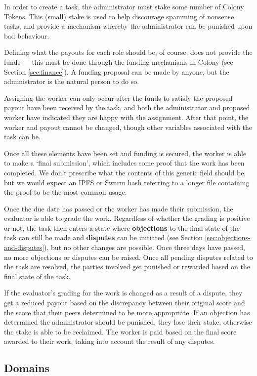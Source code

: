 In order to create a task, the administrator must stake some number of Colony Tokens. This (small) stake is used to help discourage spamming of nonsense tasks, and provide a mechanism whereby the administrator can be punished upon bad behaviour. 

Defining what the payouts for each role should be, of course, does not provide the funds --- this must be done through the funding mechanisms in Colony (see Section \ref{sec:finance}). A funding proposal can be made by anyone, but the administrator is the natural person to do so.

Assigning the worker can only occur after the funds to satisfy the proposed payout have been received by the task, and both the administrator and proposed worker have indicated they are happy with the assignment. After that point, the worker and payout cannot be changed, though other variables associated with the task can be.

Once all these elements have been set and funding is secured, the worker is able to make a `final submission', which includes some proof that the work has been completed. We don't prescribe what the contents of this generic field should be, but we would expect an IPFS or Swarm hash referring to a longer file containing the proof to be the most common usage.

Once the due date has passed or the worker has made their submission, the evaluator is able to grade the work. Regardless of whether the grading is positive or not, the task then enters a state where \textbf{objections} to the final state of the task can still be made and \textbf{disputes} can be initiated (see Section \ref{sec:objections-and-disputes}), but no other changes are possible. Once three days have passed, no more objections or disputes can be raised. Once all pending disputes related to the task are resolved, the parties involved get punished or rewarded based on the final state of the task.

If the evaluator's grading for the work is changed as a result of a dispute, they get a reduced payout based on the discrepancy between their original score and the score that their peers determined to be more appropriate. If an objection has determined the administrator should be punished, they lose their stake, otherwise the stake is able to be reclaimed. The worker is paid based on the final score awarded to their work, taking into account the result of any disputes.

\subsection{Domains}\label{sec:domains}


